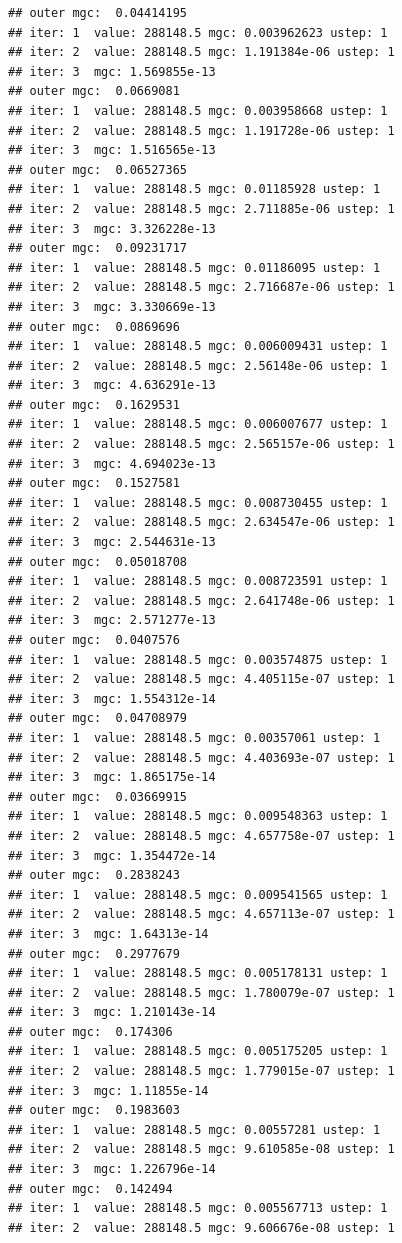 \documentclass{article}\usepackage[]{graphicx}\usepackage[]{xcolor}
\makeatletter
\newenvironment{kframe}{%
 \def\at@end@of@kframe{}%
 \ifinner\ifhmode%
  \def\at@end@of@kframe{\end{minipage}}%
  \begin{minipage}{\columnwidth}%
 \fi\fi%
 \def\FrameCommand##1{\hskip\@totalleftmargin \hskip-\fboxsep
 \colorbox{shadecolor}{##1}\hskip-\fboxsep
     \hskip-\linewidth \hskip-\@totalleftmargin \hskip\columnwidth}%
 \MakeFramed {\advance\hsize-\width
   \@totalleftmargin\z@ \linewidth\hsize
   \@setminipage}}%
 {\par\unskip\endMakeFramed%
 \at@end@of@kframe}
\newenvironment{knitrout}{}{} %
\makeatother
\begin{document}
\begin{knitrout}
\begin{kframe}
\begin{verbatim}
## outer mgc:  0.04414195 
## iter: 1  value: 288148.5 mgc: 0.003962623 ustep: 1 
## iter: 2  value: 288148.5 mgc: 1.191384e-06 ustep: 1 
## iter: 3  mgc: 1.569855e-13 
## outer mgc:  0.0669081 
## iter: 1  value: 288148.5 mgc: 0.003958668 ustep: 1 
## iter: 2  value: 288148.5 mgc: 1.191728e-06 ustep: 1 
## iter: 3  mgc: 1.516565e-13 
## outer mgc:  0.06527365 
## iter: 1  value: 288148.5 mgc: 0.01185928 ustep: 1 
## iter: 2  value: 288148.5 mgc: 2.711885e-06 ustep: 1 
## iter: 3  mgc: 3.326228e-13 
## outer mgc:  0.09231717 
## iter: 1  value: 288148.5 mgc: 0.01186095 ustep: 1 
## iter: 2  value: 288148.5 mgc: 2.716687e-06 ustep: 1 
## iter: 3  mgc: 3.330669e-13 
## outer mgc:  0.0869696 
## iter: 1  value: 288148.5 mgc: 0.006009431 ustep: 1 
## iter: 2  value: 288148.5 mgc: 2.56148e-06 ustep: 1 
## iter: 3  mgc: 4.636291e-13 
## outer mgc:  0.1629531 
## iter: 1  value: 288148.5 mgc: 0.006007677 ustep: 1 
## iter: 2  value: 288148.5 mgc: 2.565157e-06 ustep: 1 
## iter: 3  mgc: 4.694023e-13 
## outer mgc:  0.1527581 
## iter: 1  value: 288148.5 mgc: 0.008730455 ustep: 1 
## iter: 2  value: 288148.5 mgc: 2.634547e-06 ustep: 1 
## iter: 3  mgc: 2.544631e-13 
## outer mgc:  0.05018708 
## iter: 1  value: 288148.5 mgc: 0.008723591 ustep: 1 
## iter: 2  value: 288148.5 mgc: 2.641748e-06 ustep: 1 
## iter: 3  mgc: 2.571277e-13 
## outer mgc:  0.0407576 
## iter: 1  value: 288148.5 mgc: 0.003574875 ustep: 1 
## iter: 2  value: 288148.5 mgc: 4.405115e-07 ustep: 1 
## iter: 3  mgc: 1.554312e-14 
## outer mgc:  0.04708979 
## iter: 1  value: 288148.5 mgc: 0.00357061 ustep: 1 
## iter: 2  value: 288148.5 mgc: 4.403693e-07 ustep: 1 
## iter: 3  mgc: 1.865175e-14 
## outer mgc:  0.03669915 
## iter: 1  value: 288148.5 mgc: 0.009548363 ustep: 1 
## iter: 2  value: 288148.5 mgc: 4.657758e-07 ustep: 1 
## iter: 3  mgc: 1.354472e-14 
## outer mgc:  0.2838243 
## iter: 1  value: 288148.5 mgc: 0.009541565 ustep: 1 
## iter: 2  value: 288148.5 mgc: 4.657113e-07 ustep: 1 
## iter: 3  mgc: 1.64313e-14 
## outer mgc:  0.2977679 
## iter: 1  value: 288148.5 mgc: 0.005178131 ustep: 1 
## iter: 2  value: 288148.5 mgc: 1.780079e-07 ustep: 1 
## iter: 3  mgc: 1.210143e-14 
## outer mgc:  0.174306 
## iter: 1  value: 288148.5 mgc: 0.005175205 ustep: 1 
## iter: 2  value: 288148.5 mgc: 1.779015e-07 ustep: 1 
## iter: 3  mgc: 1.11855e-14 
## outer mgc:  0.1983603 
## iter: 1  value: 288148.5 mgc: 0.00557281 ustep: 1 
## iter: 2  value: 288148.5 mgc: 9.610585e-08 ustep: 1 
## iter: 3  mgc: 1.226796e-14 
## outer mgc:  0.142494 
## iter: 1  value: 288148.5 mgc: 0.005567713 ustep: 1 
## iter: 2  value: 288148.5 mgc: 9.606676e-08 ustep: 1 

\end{verbatim}
\end{kframe}
\end{knitrout}
\end{document}
